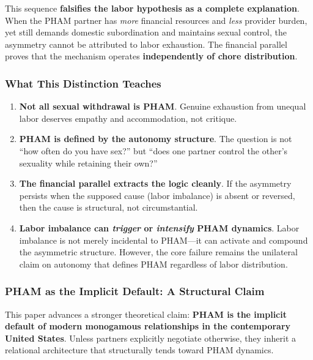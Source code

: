 \documentclass[12pt, letterpaper]{article}
\begin{document}
This sequence \textbf{falsifies the labor hypothesis as a complete explanation}. When the PHAM partner has \textit{more} financial resources and \textit{less} provider burden, yet still demands domestic subordination and maintains sexual control, the asymmetry cannot be attributed to labor exhaustion. The financial parallel proves that the mechanism operates \textbf{independently of chore distribution}.

\subsubsection{What This Distinction Teaches}

\begin{enumerate}
    \item \textbf{Not all sexual withdrawal is PHAM}. Genuine exhaustion from unequal labor deserves empathy and accommodation, not critique.
    
    \item \textbf{PHAM is defined by the autonomy structure}. The question is not ``how often do you have sex?'' but ``does one partner control the other's sexuality while retaining their own?''
    
    \item \textbf{The financial parallel extracts the logic cleanly}. If the asymmetry persists when the supposed cause (labor imbalance) is absent or reversed, then the cause is structural, not circumstantial.
    
    \item \textbf{Labor imbalance can \textit{trigger} or \textit{intensify} PHAM dynamics}. Labor imbalance is not merely incidental to PHAM---it can activate and compound the asymmetric structure. However, the core failure remains the unilateral claim on autonomy that defines PHAM regardless of labor distribution.
\end{enumerate}

\subsubsection{PHAM as the Implicit Default: A Structural Claim}

This paper advances a stronger theoretical claim: \textbf{PHAM is the implicit default of modern monogamous relationships in the contemporary United States}. Unless partners explicitly negotiate otherwise, they inherit a relational architecture that structurally tends toward PHAM dynamics.
\end{document}
